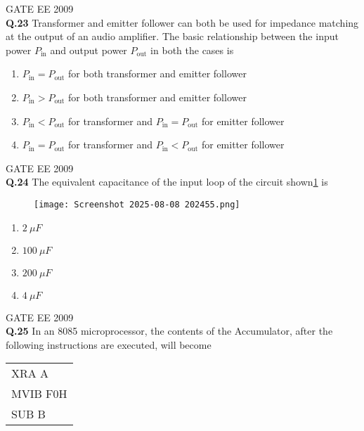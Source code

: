 \documentclass[12pt]{article}
\begin{document}
\vspace{0.5cm}
\hspace{10pt}
GATE EE 2009\\
\noindent\textbf{Q.23} Transformer and emitter follower can both be used for impedance matching at the output of an audio amplifier. The basic relationship between the input power $P_{\text{in}}$ and output power $P_{\text{out}}$ in both the cases is

\begin{enumerate}
    \item $P_{\text{in}} = P_{\text{out}}$ for both transformer and emitter follower
    \item $P_{\text{in}} > P_{\text{out}}$ for both transformer and emitter follower
    \item $P_{\text{in}} < P_{\text{out}}$ for transformer and $P_{\text{in}} = P_{\text{out}}$ for emitter follower
    \item $P_{\text{in}} = P_{\text{out}}$ for transformer and $P_{\text{in}} < P_{\text{out}}$ for emitter follower
\end{enumerate}


\vspace{0.5cm}
\hspace{10pt}
GATE EE 2009\\
\noindent\textbf{Q.24} The equivalent capacitance of the input loop of the circuit shown\ref{fig:8} is
\begin{figure}[h]
    \centering
    \texttt{[image: Screenshot 2025-08-08 202455.png]}
    \label{fig:8}
\end{figure}



\begin{enumerate}
    \item $2\ \mu F$
    \item $100\ \mu F$
    \item $200\ \mu F$
    \item $4\ \mu F$
\end{enumerate}

\vspace{0.5cm}
\hspace{10pt}
GATE EE 2009\\
\noindent\textbf{Q.25} In an 8085 microprocessor, the contents of the Accumulator, after the following instructions are executed, will become

\medskip
\begin{tabular}{l}
XRA A \\
MVIB F0H \\
SUB B
\end{tabular}
\end{document}
